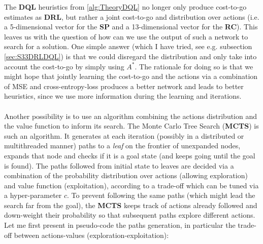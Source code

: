 The \textbf{DQL} heuristics from \ref{alg:TheoryDQL} no longer only produce cost-to-go estimates as \textbf{DRL}, but rather a joint cost-to-go and distribution over actions (i.e. a 5-dimensional vector for the \textbf{SP} and a 13-dimensional vector for the \textbf{RC}). This leaves us with the question of how can we use the output of such a network to search for a solution. One simple answer (which I have tried, see e.g. subsection \ref{sec:S33DRLDQL}) is that we could disregard the distribution and only take into account the cost-to-go by simply using $A^{*}$. The rationale for doing so is that we might hope that jointly learning the cost-to-go and the actions via a combination of MSE and cross-entropy-loss produces a better network and leads to better heuristics, since we use more information during the learning and iterations.
\\
\\
Another possibility is to use an algorithm combining the actions distribution and the value function to inform its search. The Monte Carlo Tree Search (\textbf{MCTS}) is such an algorithm. It generates at each iteration (possibly in a distributed or multithreaded manner) paths to a \textit{leaf} on the frontier of unexpanded nodes, expands that node and checks if it is a goal state (and keeps going until the goal is found). The paths followed from initial state to leaves are decided via a combination of the probability distribution over actions (allowing exploration) and value function (exploitation), according to a trade-off which can be tuned via a hyper-parameter $c$. To prevent following the same paths (which might lead the search far from the goal), the \textbf{MCTS} keeps track of actions already followed and down-weight their probability so that subsequent paths explore different actions. Let me first present in pseudo-code the paths generation, in particular the trade-off between actions-values (exploration-exploitation):
\\


